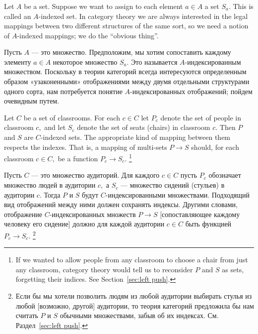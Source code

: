 \documentclass[CT4S-EN-RU]{subfiles}
\begin{document}

\subsubsection{}\label{sec:indexed sets}

\begin{blockENG}
Let $A$ be a set. Suppose we want to assign to each element $a\in A$ a set $S_a.$ This is called an $A$-indexed set. In category theory we are always interested in the legal mappings between two different structures of the same sort, so we need a notion of $A$-indexed mappings; we do the “obvious thing”.
\end{blockENG}

\begin{blockRUS}
Пусть $A$ — это множество. Предположим, мы хотим сопоставить каждому элементу $a\in A$ некоторое множество $S_a.$ Это называется $A$-индексированным множеством. Поскольку в теории категорий всегда интересуются определенным образом «узаконенными» отображениями между двумя отдельными структурами одного сорта, нам потребуется понятие $A$-индексированных отображений; пойдем очевидным путем. 
\end{blockRUS}

\begin{exampleENG}\label{ex:classroom seats}
Let $C$ be a set of classrooms. For each $c\in C$ let $P_c$ denote the set of people in classroom $c,$ and let $S_c$ denote the set of seats (chairs) in classroom $c.$ Then $P$ and $S$ are $C$-indexed sets. The appropriate kind of mapping between them respects the indexes. That is, a mapping of multi-sets $P\to S$ should, for each classroom $c\in C,$ be a function $P_c\to S_c.$%
\footnote{If we wanted to allow people from any classroom to choose a chair from just any classroom, category theory would tell us to reconsider $P$ and $S$ as sets, forgetting their indices. See Section~\ref{sec:left push}.}
\end{exampleENG}

\begin{exampleRUS}\label{ex:classroom seats}
Пусть $C$ — это множество аудиторий. Для каждого $c\in C$ пусть $P_c$ обозначает множество людей в аудитории $c,$ а $S_c$ — множество сидений (стульев) в аудитории $c.$ Тогда $P$ и $S$ будут $C$-индексированными множествами. Подходящий вид отображений между ними должен сохранять индексы. Другими словами, отображение $C$-индексированных множеств $P\to S$ [сопоставляющее каждому человеку его сидение] должно для каждой аудитории $c\in C$ быть функцией $P_c\to S_c.$%
\footnote{Если бы мы хотели позволить людям из любой аудитории выбирать стулья из любой [возможно, другой] аудитории, то теория категорий предложила бы нам считать $P$ и $S$ обычными множествами, забыв об их индексах. См. Раздел~\ref{sec:left push}.}
\end{exampleRUS}
\end{document}
